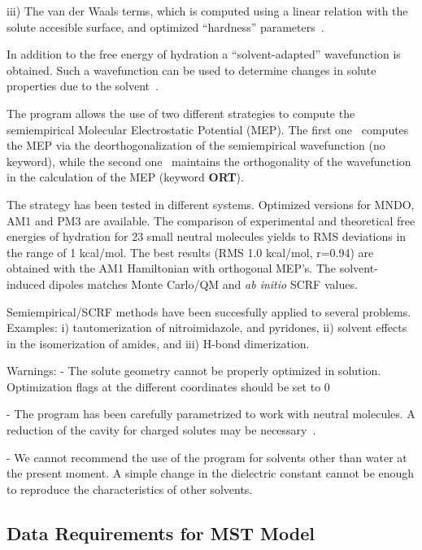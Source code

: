 iii) The van der Waals terms, which is computed using a linear relation with 
the solute accesible surface, and optimized ``hardness'' parameters~\cite{rap}.

In addition to the free energy of hydration a ``solvent-adapted'' wavefunction 
is obtained. Such a wavefunction can be used to determine changes in 
solute properties due to the solvent~\cite{lobg,lo,lo2,lobg2}.

The program allows the use of two different strategies to compute the 
semiempirical Molecular Electrostatic Potential (MEP). The first 
one~\cite{lio,alo,lo3}
computes the MEP via the deorthogonalization of the semiempirical 
wavefunction (no keyword), while the second one~\cite{frr,alo2} maintains the 
orthogonality of the wavefunction in the calculation of the MEP (keyword {\bf ORT}).
 \label{ort}

The strategy has been tested in different systems. Optimized versions for 
MNDO, AM1 and PM3 are available. The comparison of experimental and 
theoretical free energies of hydration for 23 small neutral molecules yields to 
RMS deviations in the range of 1  kcal/mol. The best results 
(RMS 1.0 kcal/mol, r=0.94) are obtained with the AM1 Hamiltonian with 
orthogonal MEP's. The solvent-induced dipoles matches Monte Carlo/QM and {\em ab 
initio} SCRF values.

Semiempirical/SCRF methods have been succesfully applied to several problems. 
Examples: i) tautomerization of nitroimidazole, and pyridones, ii) solvent 
effects in the isomerization of amides, and iii) H-bond dimerization.

Warnings: 
- The solute geometry cannot be properly optimized in solution. Optimization flags 
at the different coordinates should be set to 0

- The program has been carefully parametrized to work with neutral molecules. 
A reduction of the cavity for charged solutes may be necessary~\cite{ol}.

- We cannot recommend the use of the program for solvents other than 
water at the present moment. A simple change in the dielectric constant cannot 
be enough to reproduce the characteristics of other solvents.
\subsection{Data Requirements for MST Model}\label{mstdata}


